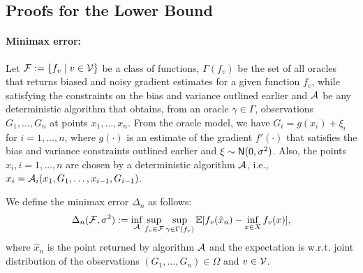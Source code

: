\subsection{Proofs for the Lower Bound}


\paragraph{Minimax error:}
Let $\mathcal{F}:= \{ f_v \mid v \in \mathcal{V}\}$ be a class of functions, $\Gamma(f_v)$ be the set of all oracles that returns biased and noisy gradient estimates for a given  function $f_v$, while satisfying the constraints on the bias and variance outlined earlier and $\mathcal{A}$ be any deterministic algorithm that obtains, from an oracle $\gamma \in \Gamma$, observations $G_1, \ldots, G_n$ at points $x_1, \ldots, x_n$. From the oracle model, we have 
$G_i = g(x_i) + \xi_i$ for $i=1,\ldots,n$, where $g(\cdot)$ is an estimate of the gradient $f'(\cdot)$ that satisfies the bias and variance constraints outlined earlier and $\xi \sim \mathsf{N}(0,\sigma^2)$. Also, the points $x_i, i=1,\ldots,n$ are chosen by a deterministic algorithm $\mathcal{A}$, i.e., 
$x_i = \mathcal{A}_i(x_1, G_1, \ldots, x_{i-1}, G_{i-1})$. 

We define the minimax error $\Delta_n$ as follows:
\begin{align}
  \label{eq:minimax-err-lb}
  \Delta_n(\mathcal{F}, \sigma^2) := \inf_{\mathcal{A}} \sup_{f_v \in \mathcal{F}} \sup_{\gamma \in \Gamma(f_v)} \mathbb{E}[f_v(\hat x_n) - \inf_{x \in X}
  f_v(x)],
\end{align}
where $\hat x_n$ is the point returned by algorithm $\mathcal{A}$ and 
the expectation is w.r.t. joint distribution  of the observations $(G_1, \ldots,
G_n) \in \Omega$ and $v \in \mathcal{V}$.


